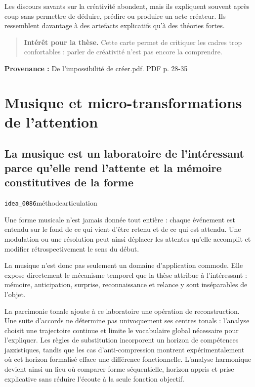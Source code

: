 \documentclass[10pt,a4paper]{article}
\begin{document}
Les discours savants sur la créativité abondent, mais ils expliquent souvent après coup sans permettre de déduire, prédire ou produire un acte créateur. Ils ressemblent davantage à des artefacts explicatifs qu'à des théories fortes.

\begin{quote}
\textbf{Intérêt pour la thèse.} Cette carte permet de critiquer les cadres trop confortables : parler de créativité n'est pas encore la comprendre.
\end{quote}
{\footnotesize\color{metadata}\textbf{Provenance :} De l'impossibilité de créer.pdf. PDF p. 28-35\par}

\section{Musique et micro-transformations de l'attention}

\subsection{La musique est un laboratoire de l'intéressant parce qu'elle rend l'attente et la mémoire constitutives de la forme}
{\small\color{metadata} \texttt{idea\_0086}\quad\textbullet\quad méthode\quad\textbullet\quad articulation\par}

Une forme musicale n'est jamais donnée tout entière : chaque événement est entendu sur le fond de ce qui vient d'être retenu et de ce qui est attendu. Une modulation ou une résolution peut ainsi déplacer les attentes qu'elle accomplit et modifier rétrospectivement le sens du début.

La musique n'est donc pas seulement un domaine d'application commode. Elle expose directement le mécanisme temporel que la thèse attribue à l'intéressant : mémoire, anticipation, surprise, reconnaissance et relance y sont inséparables de l'objet.

La parcimonie tonale ajoute à ce laboratoire une opération de reconstruction. Une suite d'accords ne détermine pas univoquement ses centres tonals : l'analyse choisit une trajectoire continue et limite le vocabulaire global nécessaire pour l'expliquer. Les règles de substitution incorporent un horizon de compétences jazzistiques, tandis que les cas d'anti-compression montrent expérimentalement où cet horizon formalisé efface une différence fonctionnelle. L'analyse harmonique devient ainsi un lieu où comparer forme séquentielle, horizon appris et prise explicative sans réduire l'écoute à la seule fonction objectif.
\end{document}
